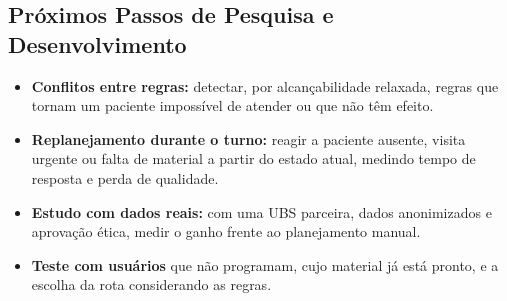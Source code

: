 \documentclass[11pt,a4paper]{article}
\begin{document}
\subsection{Próximos Passos de Pesquisa e Desenvolvimento}
\begin{itemize}
    \item \textbf{Conflitos entre regras:} detectar, por alcançabilidade relaxada, regras que tornam um paciente impossível de atender ou que não têm efeito.
    \item \textbf{Replanejamento durante o turno:} reagir a paciente ausente, visita urgente ou falta de material a partir do estado atual, medindo tempo de resposta e perda de qualidade.
    \item \textbf{Estudo com dados reais:} com uma UBS parceira, dados anonimizados e aprovação ética, medir o ganho frente ao planejamento manual.
    \item \textbf{Teste com usuários} que não programam, cujo material já está pronto, e a escolha da rota considerando as regras.
\end{itemize}
\end{document}
